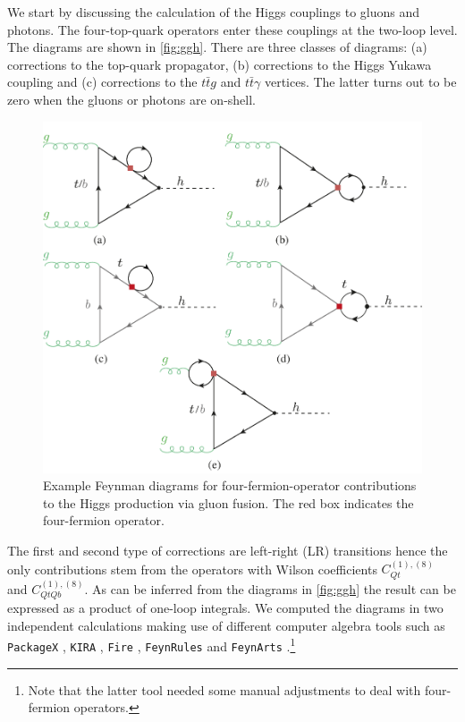 We start by discussing the calculation of the Higgs couplings to gluons and photons. The four-top-quark operators enter these couplings at the two-loop level. The diagrams are shown in \autoref{fig:ggh}. There are three classes of diagrams: (a) corrections to the top-quark propagator, (b) corrections to the Higgs Yukawa coupling and (c) corrections to the $t\bar{t}g$ and $t\bar{t}\gamma$ vertices. The latter turns out to be zero when the gluons or photons are on-shell.
\begin{figure}[t!]
	\begin{center}
		\includegraphics[width=12cm]{fig/ggF-4F_NLO.pdf}
		\caption{Example Feynman diagrams for four-fermion-operator contributions to the Higgs production via gluon fusion. The red box indicates the four-fermion operator.\label{fig:ggh} }
	\end{center}
\end{figure}
The first and second type of corrections are left-right (LR) transitions hence the only contributions stem from the operators with Wilson coefficients $C_{Qt}^{(1),(8)}$ and $C^{(1),(8)}_{QtQb}$.
As can be inferred from the diagrams in \autoref{fig:ggh} the result can be expressed as a product of one-loop integrals. We computed the diagrams in two independent calculations making use of different computer algebra tools such as \texttt{PackageX} \cite{Patel:2015tea}, \texttt{KIRA} \cite{Maierhoefer:2017hyi}, \texttt{Fire} \cite{Smirnov:2008iw}, \texttt{FeynRules} \cite{Alloul:2013bka} and \texttt{FeynArts} \cite{Hahn:2000kx}.\footnote{Note that the latter tool needed some manual adjustments to deal with four-fermion operators.}  
